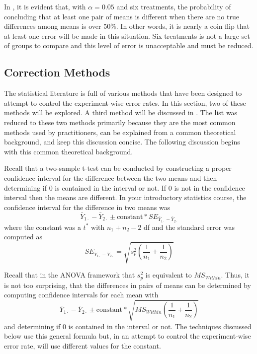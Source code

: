 \documentclass[10pt,openany]{book}\usepackage[]{graphicx}\usepackage[]{color}
\begin{document}

In , it is evident that, with $\alpha=0.05$ and six treatments, the probability of concluding that at least one pair of means is different when there are no true differences among means is over 50\%.  In other words, it is nearly a coin flip that at least one error will be made in this situation.  Six treatments is not a large set of groups to compare and this level of error is unacceptable and must be reduced.


\subsection{Correction Methods}
The statistical literature is full of various methods that have been designed to attempt to control the experiment-wise error rates.  In this section, two of these methods will be explored.  A third method will be discussed in .  The list was reduced to these two methods primarily because they are the most common methods used by practitioners, can be explained from a common theoretical background, and keep this discussion concise.  The following discussion begins with this common theoretical background.

Recall that a two-sample t-test can be conducted by constructing a proper confidence interval for the difference between the two means and then determining if 0 is contained in the interval or not.  If 0 is not in the confidence interval then the means are different.  In your introductory statistics course, the confidence interval for the difference in two means was
\[ \bar{Y}_{1\cdot}-\bar{Y}_{2\cdot} \pm \text{constant}*SE_{\bar{Y}_{1\cdot}-\bar{Y}_{2\cdot}} \]
where the constant was a $t^{*}$ with $n_{1}+n_{2}-2$ df and the standard error was computed as
\[ SE_{\bar{Y}_{1\cdot}-\bar{Y}_{2\cdot}} = \sqrt{s_{p}^{2}\left(\frac{1}{n_{1}}+\frac{1}{n_{2}}\right)} \]

Recall that in the ANOVA framework that $s_{p}^{2}$ is equivalent to $MS_{Within}$.  Thus, it is not too surprising, that the differences in pairs of means can be determined by computing confidence intervals for each mean with
\[ \bar{Y}_{1\cdot}-\bar{Y}_{2\cdot} \pm \text{constant}* \sqrt{MS_{Within}\left(\frac{1}{n_{1}}+\frac{1}{n_{2}}\right)} \]
and determining if 0 is contained in the interval or not.  The techniques discussed below use this general formula but, in an attempt to control the experiment-wise error rate, will use different values for the constant.
\end{document}
